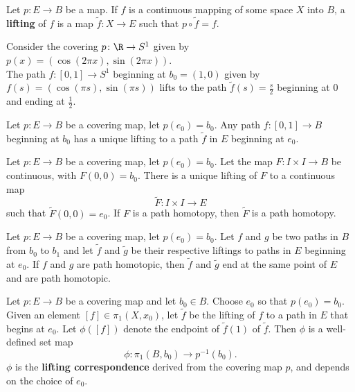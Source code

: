 \begin{definition}[Lifting]
Let $p\colon E \rightarrow B$ be a map. If $f$ is a continuous mapping of some space $X$ into $B$, a \textbf{lifting} of $f$ is a map $\tilde{f}\colon X \rightarrow E$ such that $p \circ \tilde{f} = f$. 
\end{definition}


\begin{eg}
Consider the covering $p\colon \R \rightarrow S^1$ given by $p(x) = (\cos (2\pi x), \sin (2\pi x))$. \\

The path $f\colon [0, 1] \rightarrow S^1$ beginning at $b_0 = (1, 0)$ given by $f(s) = (\cos (\pi s), \sin (\pi s))$ lifts to the path $\tilde{f}(s) = \frac{s}{2}$ beginning at $0$ and ending at $\frac{1}{2}$.
\end{eg}

\begin{lemma}
Let $p\colon E \rightarrow B$ be a covering map, let $p(e_0) = b_0$. Any path $f\colon [0, 1] \rightarrow B$ beginning at $b_0$ has a unique lifting to a path $\tilde{f}$ in $E$ beginning at $e_0$.
\end{lemma}

\begin{lemma}
Let $p\colon E \rightarrow B$ be a covering map, let $p(e_0) = b_0$. Let the map $F\colon I \times I \rightarrow B$ be continuous, with $F(0, 0) = b_0$. There is a unique lifting of $F$ to a continuous map
\[
    \tilde{F}\colon I \times I \rightarrow E
\]
such that $\tilde{F}(0, 0) = e_0$. If $F$ is a path homotopy, then $\tilde{F}$ is a path homotopy.
\end{lemma}

\begin{theorem}
Let $p\colon E \rightarrow B$ be a covering map, let $p(e_0) = b_0$. Let $f$ and $g$ be two paths in $B$ from $b_0$ to $b_1$ and let $\tilde{f}$ and $\tilde{g}$ be their respective liftings to paths in $E$ beginning at $e_0$.
If $f$ and $g$ are path homotopic, then $\tilde{f}$ and $\tilde{g}$ end at the same point of $E$ and are path homotopic.
\end{theorem}

\begin{definition}
Let $p\colon E \rightarrow B$ be a covering map and let $b_0 \in B$. Choose $e_0$ so that $p(e_0) = b_0$. Given an element $[f] \in \pi _1(X, x_0)$, let $\tilde{f}$ be the lifting of $f$ to a path in $E$ that begins at $e_0$. 
Let $\phi([f])$ denote the endpoint of $\tilde{f}(1)$ of $\tilde{f}$. Then $\phi$ is a well-defined set map
\[
    \phi\colon \pi _1(B, b_0) \rightarrow p^{-1}(b_0).
\]
$\phi$ is the \textbf{lifting correspondence} derived from the covering map $p$, and depends on the choice of $e_0$.
\end{definition}

